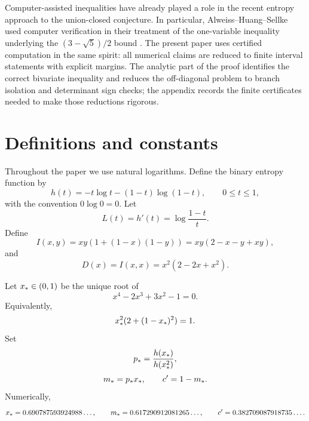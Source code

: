 Computer-assisted inequalities have already played a role in the recent
entropy approach to the union-closed conjecture.  In particular,
Alweiss--Huang--Sellke used computer verification in their treatment of the
one-variable inequality underlying the \((3-\sqrt5)/2\) bound
\cite{AlweissHuangSellke2024}.  The present paper uses certified computation
in the same spirit: all numerical claims are reduced to finite interval
statements with explicit margins.  The analytic part of the proof identifies
the correct bivariate inequality and reduces the off-diagonal problem to
branch isolation and determinant sign checks; the appendix records the finite
certificates needed to make those reductions rigorous.

\section{Definitions and constants}\label{sec:defs}

Throughout the paper we use natural logarithms.  Define the binary entropy function by
\begin{equation}\label{eq:hdef}
  h(t)=-t\log t-(1-t)\log(1-t),
  \qquad 0\le t\le 1,
\end{equation}
with the convention \(0\log0=0\).  Let
\begin{equation}\label{eq:Ldef}
  L(t)=h'(t)=\log\frac{1-t}{t}.
\end{equation}
Define
\begin{equation}\label{eq:Idef}
  I(x,y)=xy(1+(1-x)(1-y))=xy(2-x-y+xy),
\end{equation}
and
\begin{equation}\label{eq:Ddef}
  D(x)=I(x,x)=x^2(2-2x+x^2).
\end{equation}

Let \(x_*\in(0,1)\) be the unique root of
\begin{equation}\label{eq:xstarpoly}
  x^4-2x^3+3x^2-1=0.
\end{equation}
Equivalently,
\begin{equation}\label{eq:xstarequiv}
  x_*^2(2+(1-x_*)^2)=1.
\end{equation}
Set
\begin{equation}\label{eq:pstar}
  p_* = \frac{h(x_*)}{h(x_*^2)},
\end{equation}
\begin{equation}\label{eq:mstar}
  m_*=p_*x_*,
  \qquad
  c'=1-m_*.
\end{equation}
Numerically,
\begin{equation}\label{eq:mstar_numeric}
  x_*=0.690787593924988\ldots,
  \qquad
  m_*=0.617290912081265\ldots,
  \qquad
  c'=0.382709087918735\ldots .
\end{equation}

